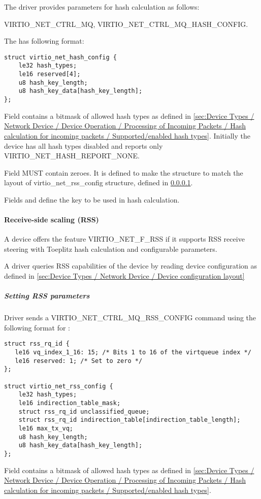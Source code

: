 The driver provides parameters for hash calculation as follows:

 VIRTIO_NET_CTRL_MQ,  VIRTIO_NET_CTRL_MQ_HASH_CONFIG.

The  has following format:
\begin{lstlisting}
struct virtio_net_hash_config {
    le32 hash_types;
    le16 reserved[4];
    u8 hash_key_length;
    u8 hash_key_data[hash_key_length];
};
\end{lstlisting}
Field  contains a bitmask of allowed hash types as
defined in
\ref{sec:Device Types / Network Device / Device Operation / Processing of Incoming Packets / Hash calculation for incoming packets / Supported/enabled hash types}.
Initially the device has all hash types disabled and reports only VIRTIO_NET_HASH_REPORT_NONE.

Field  MUST contain zeroes. It is defined to make the structure to match the layout of virtio_net_rss_config structure,
defined in \ref{sec:Device Types / Network Device / Device Operation / Control Virtqueue / Receive-side scaling (RSS)}.

Fields  and  define the key to be used in hash calculation.

\paragraph{Receive-side scaling (RSS)}\label{sec:Device Types / Network Device / Device Operation / Control Virtqueue / Receive-side scaling (RSS)}
A device offers the feature VIRTIO_NET_F_RSS if it supports RSS receive steering with Toeplitz hash calculation and configurable parameters.

A driver queries RSS capabilities of the device by reading device configuration as defined in \ref{sec:Device Types / Network Device / Device configuration layout}

\subparagraph{Setting RSS parameters}\label{sec:Device Types / Network Device / Device Operation / Control Virtqueue / Receive-side scaling (RSS) / Setting RSS parameters}

Driver sends a VIRTIO_NET_CTRL_MQ_RSS_CONFIG command using the following format for :
\begin{lstlisting}
struct rss_rq_id {
   le16 vq_index_1_16: 15; /* Bits 1 to 16 of the virtqueue index */
   le16 reserved: 1; /* Set to zero */
};

struct virtio_net_rss_config {
    le32 hash_types;
    le16 indirection_table_mask;
    struct rss_rq_id unclassified_queue;
    struct rss_rq_id indirection_table[indirection_table_length];
    le16 max_tx_vq;
    u8 hash_key_length;
    u8 hash_key_data[hash_key_length];
};
\end{lstlisting}
Field  contains a bitmask of allowed hash types as
defined in
\ref{sec:Device Types / Network Device / Device Operation / Processing of Incoming Packets / Hash calculation for incoming packets / Supported/enabled hash types}.

